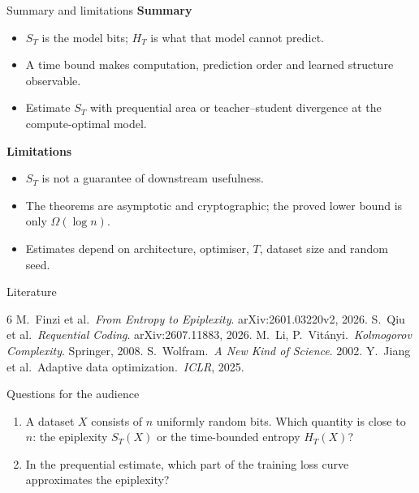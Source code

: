 \documentclass[aspectratio=169,notheorems]{beamer}
\theoremstyle{definition}
\begin{document}
\begin{frame}{Summary and limitations}
\textbf{Summary}
\begin{itemize}\setlength{\itemsep}{0.3em}
\item $S_T$ is the model bits; $H_T$ is what that model cannot predict.
\item A time bound makes computation, prediction order and learned structure observable.
\item Estimate $S_T$ with prequential area or teacher--student divergence at the compute-optimal model.
\end{itemize}
\medskip
\textbf{Limitations}
\begin{itemize}\setlength{\itemsep}{0.3em}
\item $S_T$ is not a guarantee of downstream usefulness.
\item The theorems are asymptotic and cryptographic; the proved lower bound is only $\Omega(\log n)$.
\item Estimates depend on architecture, optimiser, $T$, dataset size and random seed.
\end{itemize}
\end{frame}
\begin{frame}[t]{Literature}
\scriptsize
\begin{thebibliography}{6}\setlength{\itemsep}{0.2em}
M.~Finzi et al.\ \emph{From Entropy to Epiplexity}. arXiv:2601.03220v2, 2026.
S.~Qiu et al.\ \emph{Requential Coding}. arXiv:2607.11883, 2026.
M.~Li, P.~Vit\'anyi.\ \emph{Kolmogorov Complexity}. Springer, 2008.
S.~Wolfram.\ \emph{A New Kind of Science}. 2002.
Y.~Jiang et al.\ Adaptive data optimization.\ \emph{ICLR}, 2025.
\end{thebibliography}
\end{frame}
\begin{frame}{Questions for the audience}
\begin{enumerate}\setlength{\itemsep}{2.5em}
\item A dataset $X$ consists of $n$ uniformly random bits. Which quantity is close to $n$: the epiplexity $S_T(X)$ or the time-bounded entropy $H_T(X)$?
\item In the prequential estimate, which part of the training loss curve approximates the epiplexity?
\end{enumerate}
\end{frame}
\end{document}
